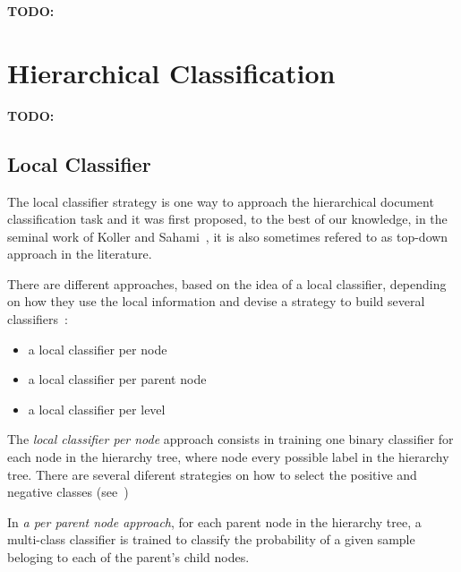 \documentclass[11pt]{article}
\begin{document}
\textbf{TODO:}


\section{Hierarchical Classification}

\textbf{TODO:}

\subsection{Local Classifier}

The local classifier strategy is one way to approach the hierarchical document classification task
and it was first proposed, to the best of our knowledge, in the seminal work of Koller and
Sahami~, it is also sometimes refered to as top-down
approach in the literature.

There are different approaches, based on the idea of a local classifier, depending on how they use
the local information and devise a strategy to build several classifiers~\cite{Silla:2011:SHC:1937796.1937884}:

\begin{itemize}
\item{a local classifier per node}
\item{a local classifier per parent node}
\item{a local classifier per level}
\end{itemize}


The \textit{local classifier per node} approach consists in training one binary classifier for each
node in the hierarchy tree, where node every possible label in the hierarchy tree. There are several
diferent strategies on how to select the positive and negative classes (see~\cite{})


In \textit{a per parent node approach}, for each parent node in the hierarchy tree, a multi-class
classifier is trained to classify the probability of a given sample beloging to each of the parent's
child nodes.


\end{document}

